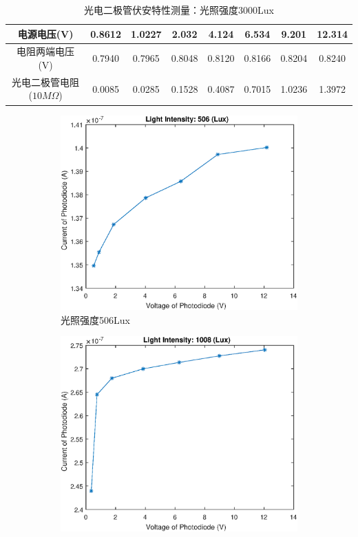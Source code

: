 \documentclass{ctexart}
\begin{document}
\begin{table}[H]
  \centering
  \begin{tabular}{|c|c|c|c|c|c|c|c|}
    \hline
    电源电压(V) &0.8612&1.0227&2.032&4.124&6.534&9.201&12.314\\\hline
    电阻两端电压(V) &0.7940&0.7965&0.8048&0.8120&0.8166&0.8204&0.8240\\\hline
    光电二极管电阻($10M\Omega$) & 0.0085&0.0285&0.1528&0.4087&0.7015&1.0236&1.3972\\\hline
  \end{tabular}
  \caption{光电二极管伏安特性测量：光照强度3000Lux}
\end{table}

\begin{figure}[H]
  \centering
  \begin{subfigure}{.45\textwidth}
    \centering
    \includegraphics[width=\linewidth]{光电传感器综合实验图像/photodiode_506Lux}
    \caption{光照强度506Lux}
  \end{subfigure}
  \begin{subfigure}{.45\textwidth}
    \centering
    \includegraphics[width=\linewidth]{光电传感器综合实验图像/photodiode_1008Lux}

\end{subfigure}
\end{figure}
\end{document}

